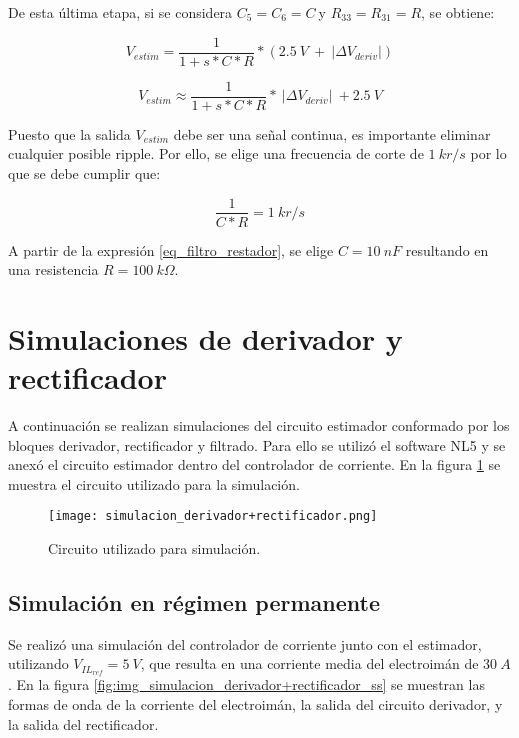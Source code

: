 De esta última etapa, si se considera $C_5=C_6=C\ $y $R_{33}=R_{31}=R$, se obtiene:


\begin{equation} \label{eq_Vestim_1}
	V_{estim}=\frac{1}{1+s*C*R}*(2.5\: V\ +\ |\mathit{\Delta}V_{deriv}|)
\end{equation}

\begin{equation} \label{eq_Vestim_2}
	V_{estim} \approx \frac{1}{1+s*C*R}*\ |\mathit{\Delta}V_{deriv}|\ +2.5\:V
\end{equation}

Puesto que la salida $V_{estim}$ debe ser una señal continua, es importante eliminar cualquier posible ripple. Por ello, se elige una frecuencia de corte de $1\:kr/s$ por lo que se debe cumplir que:

\begin{equation}\label{eq_filtro_restador}
	 \frac{1}{C*R}=1\:kr/s
\end{equation}

A partir de la expresión \ref{eq_filtro_restador}, se elige $C=10\: nF$ resultando en una resistencia $R=100\:k\Omega$.

\section{Simulaciones de derivador y rectificador}

A continuación se realizan simulaciones del circuito estimador conformado por los bloques derivador, rectificador y filtrado. Para ello se utilizó el software NL5 y se anexó el circuito estimador dentro del controlador de corriente. En la figura \ref{fig:img_simulacion_derivador+rectificador} se muestra el circuito utilizado para la simulación.

\begin{figure}[H]
	\centering
	\texttt{[image: simulacion\_derivador+rectificador.png]}
	\caption{Circuito utilizado para simulación.}
	\label{fig:img_simulacion_derivador+rectificador}
\end{figure}

\subsection{Simulación en régimen permanente} \label{sec_simulacion_estimador_basico}

Se realizó una simulación del controlador de corriente junto con el estimador, utilizando $V_{IL_{ref}}=5\:V$, que resulta en una corriente media del electroimán de $30\:A$. En la figura \ref{fig:img_simulacion_derivador+rectificador_ss} se muestran las formas de onda de la corriente del electroimán, la salida del circuito derivador, y la salida del rectificador. 

